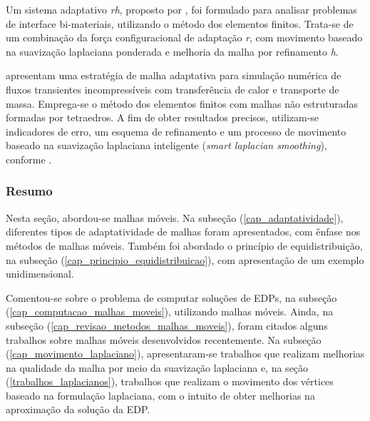 Um sistema adaptativo {\it rh}, proposto por , foi formulado para analisar problemas de interface bi-materiais, utilizando o método dos elementos finitos. Trata-se de um combinação da força configuracional de adaptação {\it r}, com movimento baseado na suavização laplaciana ponderada e melhoria da malha por refinamento {\it h}.

 apresentam uma estratégia de malha adaptativa para simulação numérica de fluxos transientes incompressíveis com transferência de calor e transporte de massa. Emprega-se o método dos elementos finitos com malhas não estruturadas formadas por tetraedros.  A fim de obter resultados precisos, utilizam-se indicadores de erro, um esquema de refinamento e um processo de movimento baseado na suavização laplaciana inteligente ({\it smart laplacian smoothing}), conforme .

\subsubsection{Resumo}
\label{cap_malhas_moveis_consideracoes_finais}

Nesta seção, abordou-se malhas móveis. Na subseção (\ref{cap_adaptatividade}), diferentes tipos de adaptatividade de malhas foram apresentados, com ênfase nos métodos de malhas móveis. Também foi abordado o princípio de equidistribuição, na subseção (\ref{cap_principio_equidistribuicao}), com apresentação de um exemplo unidimensional. 

Comentou-se sobre o problema de computar soluções de EDPs, na subseção (\ref{cap_computacao_malhas_moveis}), utilizando malhas móveis. Ainda, na subseção (\ref{cap_revisao_metodos_malhas_moveis}), foram citados alguns trabalhos sobre malhas móveis desenvolvidos recentemente. Na subseção (\ref{cap_movimento_laplaciano}), apresentaram-se trabalhos que realizam melhorias na qualidade da malha por meio da suavização laplaciana e, na seção (\ref{trabalhos_laplacianos}), trabalhos que realizam o movimento dos vértices baseado na formulação laplaciana, com o intuito de obter melhorias na aproximação da solução da EDP.